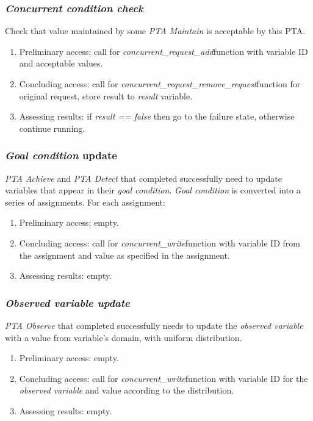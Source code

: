 \subsubsection{\textit{\textit{Concurrent condition} check} \label{memory_module_applications_concurrent_condition_check}}
Check that value maintained by some \textit{PTA Maintain} is acceptable by this PTA.
\begin{enumerate} 
\item Preliminary access: call for \textcolor{ColorUppaalFunction}{\textit{concurrent_request_add}}​ function with variable ID and acceptable values. 
\item Concluding access: call for \textcolor{ColorUppaalFunction}{\textit{concurrent_request_remove_request}}​ function for original request, store result to \textcolor{ColorEdgeGuard}{\textit{result}} variable. 
\item Assessing results: if \textcolor{ColorEdgeGuard}{\textit{result == false}} then go to the failure state, otherwise continue running.
\end{enumerate}  
\subsubsection{\textit{\textit{Goal condition}} update \label{memory_module_applications_goal_condition_update}}
\textit{PTA Achieve} and \textit{PTA Detect} that completed successfully need to update variables that appear in their \textit{\textit{goal condition}}. \textit{\textit{Goal condition}} is converted into a series of assignments. For each assignment:
\begin{enumerate} 
\item Preliminary access: empty.
\item Concluding access: call for \textcolor{ColorUppaalFunction}{\textit{concurrent_write}}​ function with variable ID from the assignment and value as specified in the assignment. 
\item Assessing results: empty.
\end{enumerate}
\subsubsection{\textit{\textit{Observed variable} update} \label{memory_module_applications_observed_variable_update}}
\textit{PTA Observe} that completed successfully needs to update the \textit{observed variable} with a value from variable’s domain, with uniform distribution.
\begin{enumerate} 
\item Preliminary access: empty.
\item Concluding access: call for \textcolor{ColorUppaalFunction}{\textit{concurrent_write}}​ function with variable ID for the \textit{observed variable} and value according to the distribution. 
\item Assessing results: empty.
\end{enumerate}
